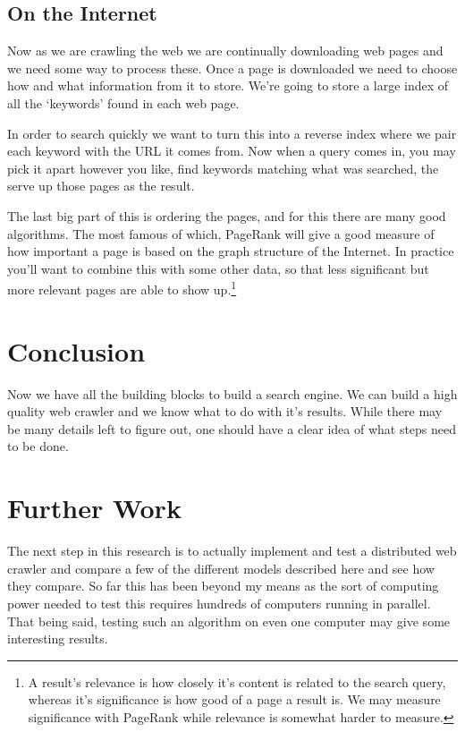 \documentclass{article}
\begin{document}
	\subsection{On the Internet}
	
	Now as we are crawling the web we are continually downloading web pages and we need some way to process these. Once a page is downloaded we need to choose how and what information from it to store. We're going to store a large index of all the `keywords' found in each web page.
	
	In order to search quickly we want to turn this into a reverse index where we pair each keyword with the URL it comes from. Now when a query comes in, you may pick it apart however you like, find keywords matching what was searched, the serve up those pages as the result.
	
	The last big part of this is ordering the pages, and for this there are many good algorithms. The most famous of which, PageRank will give a good measure of how important a page is based on the graph structure of the Internet. In practice you'll want to combine this with some other data, so that less significant but more relevant pages are able to show up.\footnote{A result's relevance is how closely it's content is related to the search query, whereas it's significance is how good of a page a result is. We may measure significance with PageRank while relevance is somewhat harder to measure.}
	
	\section{Conclusion}
	
	Now we have all the building blocks to build a search engine. We can build a high quality web crawler and we know what to do with it's results. While there may be many details left to figure out, one should have a clear idea of what steps need to be done.
	
	\section{Further Work}
	The next step in this research is to actually implement and test a distributed web crawler and compare a few of the different models described here and see how they compare. So far this has been beyond my means as the sort of computing power needed to test this requires hundreds of computers running in parallel. That being said, testing such an algorithm on even one computer may give some interesting results.
	
\end{document}
